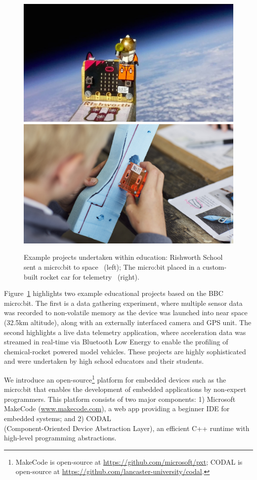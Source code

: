 \begin{figure}[t]
    \centering
    \includegraphics[width=.49\columnwidth] {images/microbit-space.jpg}
    \includegraphics[width=.49\columnwidth]{images/bloodhound.jpg}
    \setlength{\belowcaptionskip}{-10pt}
    \caption{\label{fig:projects} Example projects undertaken within education: Rishworth School sent a micro:bit to space~\cite{microbit79:online} (left); The micro:bit placed in a custom-built rocket car for telemetry~\cite{microbit73:online, microsoft:online} (right).}
    \vspace{-5pt}
\end{figure}

Figure~\ref{fig:projects} highlights two example educational projects based on the BBC micro:bit. The first is a data gathering experiment, where multiple sensor data was recorded to non-volatile memory as the device was launched into near space (32.5km altitude), along with an externally interfaced camera and GPS unit. The second highlights a live data telemetry application, where acceleration data was streamed in real-time via Bluetooth Low Energy to enable the profiling of chemical-rocket powered model vehicles. These projects are highly sophisticated and were undertaken by high school educators and their students.

We introduce an open-source\footnote{
MakeCode is open-source at \url{https://github.com/microsoft/pxt}; CODAL is open-source at
\url{https://github.com/lancaster-university/codal}.} platform for embedded devices such as the micro:bit that enables the development of embedded applications by non-expert programmers. This platform consists of two major components: 1) Microsoft MakeCode (\href{https://www.makecode.com}{www.makecode.com}), a web app providing a beginner IDE for embedded
systems; and 2) CODAL\\(Component-Oriented Device Abstraction Layer), an efficient C++ runtime with high-level programming abstractions.

